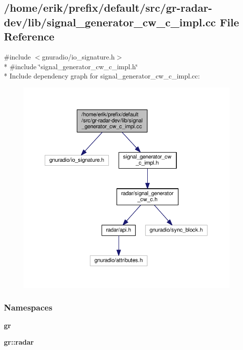 \subsection{/home/erik/prefix/default/src/gr-\/radar-\/dev/lib/signal\+\_\+generator\+\_\+cw\+\_\+c\+\_\+impl.cc File Reference}
\label{signal__generator__cw__c__impl_8cc}
{\ttfamily \#include $<$gnuradio/io\+\_\+signature.\+h$>$}\\*
{\ttfamily \#include \char`\"{}signal\+\_\+generator\+\_\+cw\+\_\+c\+\_\+impl.\+h\char`\"{}}\\*
Include dependency graph for signal\+\_\+generator\+\_\+cw\+\_\+c\+\_\+impl.\+cc\+:
\nopagebreak
\begin{figure}[H]
\begin{center}
\leavevmode
\includegraphics[width=350pt]{d1/dd8/signal__generator__cw__c__impl_8cc__incl}
\end{center}
\end{figure}
\subsubsection*{Namespaces}
\begin{DoxyCompactItemize}
\item 
 {\bf gr}
\item 
 {\bf gr\+::radar}
\end{DoxyCompactItemize}
